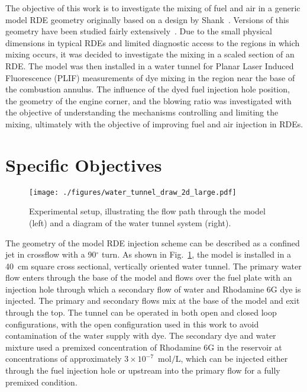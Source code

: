\documentclass[10pt, twocolumn]{article}
\begin{document}
The objective of this work is to investigate the mixing of fuel and air in a generic model RDE geometry originally based on a design by Shank~\cite{Shank2012}. Versions of this geometry have been studied fairly extensively~\cite{Naples2013,Paxson2015,George2015,Driscoll2015,Anand2016b,Pandiya2016}. Due to the small physical dimensions in typical RDEs and limited diagnostic access to the regions in which mixing occurs, it was decided to investigate the mixing in a scaled section of an RDE. The model was then installed in a water tunnel for Planar Laser Induced Fluorescence (PLIF) measurements of dye mixing in the region near the base of the combustion annulus. The influence of the dyed fuel injection hole position, the geometry of the engine corner, and the blowing ratio was investigated with the objective of understanding the mechanisms controlling and limiting the mixing, ultimately with the objective of improving fuel and air injection in RDEs.

\section*{Specific Objectives} 
\begin{figure}[b!]
	\centering
	\texttt{[image: ./figures/water\_tunnel\_draw\_2d\_large.pdf]}
	\caption{Experimental setup, illustrating the flow path through the model (left) and a diagram of the water tunnel system (right).}
	\label{fig:exp_setup}
\end{figure}

The geometry of the model RDE injection scheme can be described as a confined jet in crossflow with a 90$^{\circ}$ turn. As shown in Fig.~\ref{fig:exp_setup}, the model is installed in a 40~cm square cross sectional, vertically oriented water tunnel. The primary water flow enters through the base of the model and flows over the fuel plate with an injection hole through which a secondary flow of water and Rhodamine 6G dye is injected. The primary and secondary flows mix at the base of the model and exit through the top. The tunnel can be operated in both open and closed loop configurations, with the open configuration used in this work to avoid contamination of the water supply with dye. The secondary dye and water mixture used a premixed concentration of Rhodamine 6G in the reservoir at concentrations of approximately $3\times10^{-7}$~$\textrm{mol}/\textrm{L}$, which can be injected either through the fuel injection hole or upstream into the primary flow for a fully premixed condition.
\end{document}
